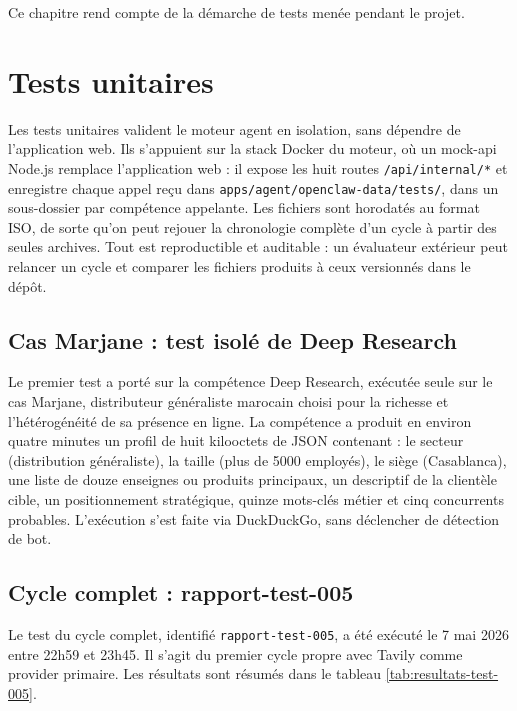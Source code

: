 \documentclass[12pt,a4paper,openany]{report}
\begin{document}
Ce chapitre rend compte de la démarche de tests menée pendant le projet.

\section{Tests unitaires}
\label{sec:tests-unitaires}

Les tests unitaires valident le moteur agent en isolation, sans dépendre de l'application web. Ils s'appuient sur la stack Docker du moteur, où un mock-api Node.js remplace l'application web : il expose les huit routes \texttt{/api/internal/*} et enregistre chaque appel reçu dans \texttt{apps/agent/openclaw-data/tests/}, dans un sous-dossier par compétence appelante. Les fichiers sont horodatés au format ISO, de sorte qu'on peut rejouer la chronologie complète d'un cycle à partir des seules archives. Tout est reproductible et auditable : un évaluateur extérieur peut relancer un cycle et comparer les fichiers produits à ceux versionnés dans le dépôt.

\subsection{Cas Marjane : test isolé de Deep Research}
\label{sec:test-marjane}

Le premier test a porté sur la compétence Deep Research, exécutée seule sur le cas Marjane, distributeur généraliste marocain choisi pour la richesse et l'hétérogénéité de sa présence en ligne. La compétence a produit en environ quatre minutes un profil de huit kilooctets de JSON contenant : le secteur (distribution généraliste), la taille (plus de 5000 employés), le siège (Casablanca), une liste de douze enseignes ou produits principaux, un descriptif de la clientèle cible, un positionnement stratégique, quinze mots-clés métier et cinq concurrents probables. L'exécution s'est faite via DuckDuckGo, sans déclencher de détection de bot.

\subsection{Cycle complet : rapport-test-005}
\label{sec:test-005}

Le test du cycle complet, identifié \texttt{rapport-test-005}, a été exécuté le 7 mai 2026 entre 22h59 et 23h45. Il s'agit du premier cycle propre avec Tavily comme provider primaire. Les résultats sont résumés dans le tableau \ref{tab:resultats-test-005}.
\end{document}
